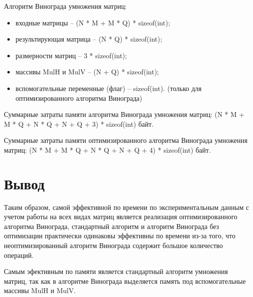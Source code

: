Алгоритм Винограда умножения матриц:
\begin{itemize}
\item входные матрицы -- (N * M + M * Q) * sizeof(int); 
\item результирующая матрица -- (N * Q) * sizeof(int); 
\item размерности матриц --  3 * sizeof(int);
\item массивы MulH и MulV -- (N + Q) * sizeof(int);
\item вспомогательные переменные (флаг) -- sizeof(int). (только для оптимизированного алгоритма Винограда)
\end{itemize}

Суммарные затраты памяти алгоритма Винограда умножения матриц:
(N * M + M * Q + N * Q + N + Q + 3) * sizeof(int) байт.

Суммарные затраты памяти оптимизированного алгоритма Винограда умножения матриц:
(N * M + M * Q + N * Q + N + Q + 4) * sizeof(int) байт.

\section*{Вывод}

Таким образом, самой эффективной по времени по экспериментальным данным с учетом работы на всех видах матриц является реализация оптимизированного алгоритма Винограда, стандартный алгоритм и алгоритм Винограда без оптимизации практически одинаковы эффективны по времени из-за того, что неоптимизированный алгоритм Винограда содержит большое количество операций. 

Самым эфективным по памяти является стандартный алгоритм умножения матриц, так как в алгоритме Винограда выделяется память под вспомогательные массивы MulH и MulV.
